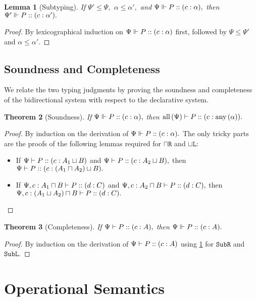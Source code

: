 \documentclass[11pt]{article}
\theoremstyle{plain}
\newtheorem{theorem}{Theorem}[section]
\newtheorem{lemma}[theorem]{Lemma}
\theoremstyle{definition}
\theoremstyle{remark}
\DeclarePairedDelimiter\parens{(}{)}             %
\newcommand\sub{\le}
\newcommand\intersect{\mathbin{\sqcap}}
\newcommand\union{\mathbin{\sqcup}}
\newcommand\irb[1]{\texttt{#1}}
\newcommand\Right{\irb{R}}
\newcommand\Left{\irb{L}}
\newcommand{\ctx}{\Psi}
\newcommand\typeProc[3]{#1 :: \parens{#2 : #3}}
\newcommand\typeS[4]{#1 \vdash \typeProc{#2}{#3}{#4}}
\newcommand\typeBi[4]{#1 \Vdash #2 :: \parens{#3 : #4}}
\newcommand{\typeList}{\alpha}
\DeclareMathOperator\all{all}
\DeclareMathOperator\any{any}
\begin{document}
\begin{lemma}[Subtyping]
  \label{bi-sub}
  If $\ctx' \le \ctx,$ $\typeList \le \typeList',$ and $\typeBi \ctx P c \typeList,$ then $\typeBi {\ctx'} P c {\typeList'}.$
\end{lemma}
\begin{proof}
  By lexicographical induction on $\typeBi \ctx P c \typeList$ first, followed by $\ctx \le \ctx'$ and $\typeList \le \typeList'.$
\end{proof}


\subsection{Soundness and Completeness}

We relate the two typing judgments by proving the soundness and completeness of the bidirectional system with respect to the declarative system.

\begin{theorem}[Soundness]
If $\typeBi \ctx P c \typeList,$ then $\typeS {\all{(\ctx)}} P c {\any{(\typeList)}}.$
\end{theorem}
\begin{proof}
  By induction on the derivation of $\typeBi \ctx P c \typeList.$ The only tricky parts are the proofs of the following lemmas required for $\intersect\Right$ and $\union\Left$:
  \begin{itemize}
    \item If $\typeS \ctx P c {A_1 \union B}$ and $\typeS \ctx P c {A_2 \union B},$ then $\typeS \ctx P c {(A_1 \intersect A_2) \union B}.$
    \item If $\typeS {\ctx, c : A_1 \intersect B} P d C$ and $\typeS {\ctx, c : A_2 \intersect B} P d C,$ then $\typeS {\ctx, c : (A_1 \union A_2) \intersect B} P d C.$
  \end{itemize}
\end{proof}

\begin{theorem}[Completeness]
If $\typeS \ctx P c A,$ then $\typeBi \ctx P c A.$
\end{theorem}
\begin{proof}
  By induction on the derivation of $\typeS \ctx P c A$ using \ref{bi-sub} for $\irb{Sub}\Right$ and $\irb{Sub}\Left.$
\end{proof}

\section{Operational Semantics}
\end{document}

